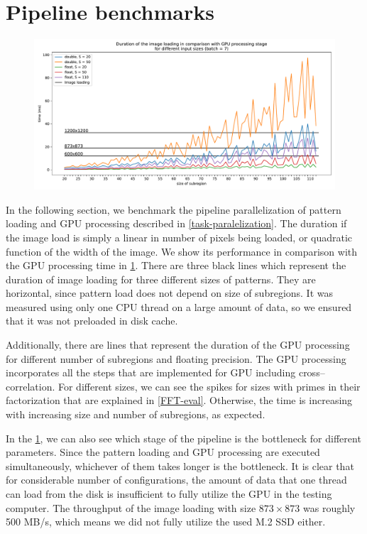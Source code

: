 \section{Pipeline benchmarks}
\label{load-eval}

\begin{figure}
	\centering
	\includegraphics[width=\textwidth]{img/eval/load-plot}
	\caption{}
	\label{load-plot}
\end{figure}

In the following section, we benchmark the pipeline parallelization of pattern loading and GPU processing described in \cref{task-paralelization}. The duration if the image load is simply a linear in number of pixels being loaded, or quadratic function of the width of the image. We show its performance in comparison with the GPU processing time in \cref{load-plot}. There are three black lines which represent the duration of image loading for three different sizes of patterns. They are horizontal, since pattern load does not depend on size of subregions. It was measured using only one CPU thread on a large amount of data, so we ensured that it was not preloaded in disk cache.

Additionally, there are lines that represent the duration of the GPU processing for different number of subregions and floating precision. The GPU processing incorporates all the steps that are implemented for GPU including cross--correlation. For different sizes, we can see the spikes for sizes with primes in their factorization that are explained in \cref{FFT-eval}. Otherwise, the time is increasing with increasing size and number of subregions, as expected.

In the \cref{load-plot}, we can also see which stage of the pipeline is the bottleneck for different parameters. Since the pattern loading and GPU processing are executed simultaneously, whichever of them takes longer is the bottleneck. It is clear that for considerable number of configurations, the amount of data that one thread can load from the disk is insufficient to fully utilize the GPU in the testing computer. The throughput of the image loading with size $873\times873$ was roughly 500 MB/s, which means we did not fully utilize the used M.2 SSD either.

